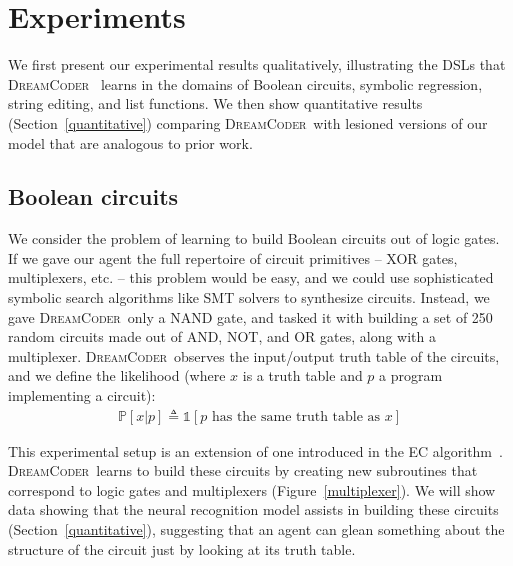 \documentclass{article}
\newcommand{\system}{\textsc{DreamCoder}~}
\newcommand{\indicator}{\mathds{1}} %
\newcommand{\probability}{\mathds{P}} %
\begin{document}
\section{Experiments}
We first present our experimental results qualitatively,
illustrating the DSLs that  \system
learns in the domains of Boolean circuits, symbolic regression, string editing, and list functions.
We then show quantitative results (Section~\ref{quantitative})
comparing \system with lesioned versions
of our model that are analogous to prior work.

\subsection{Boolean circuits}
We consider the problem of learning
to build  Boolean circuits out of logic gates.
If we gave our agent the full repertoire of
circuit primitives -- XOR gates, multiplexers, etc. -- this problem would be easy,
and we could use sophisticated symbolic search algorithms like SMT solvers to synthesize circuits.
Instead, we gave \system only a NAND gate,
and tasked it with building a set of 250 random circuits made out of
AND, NOT, and OR gates, along with a multiplexer.
\system observes the input/output truth table of the circuits,
and we define the likelihood (where $x$ is a truth table and $p$ a program implementing a circuit):
\begin{align}
  \probability[x|p]\triangleq\indicator\left[p\text{ has  the same truth table as }x \right]\nonumber
  \end{align}

This experimental setup is an extension of one introduced in the EC algorithm~\cite{Dechter:2013:BLV:2540128.2540316}.
\system learns to build these
circuits by creating new subroutines that correspond to
logic gates and multiplexers (Figure~\ref{multiplexer}).
We will show data showing that the neural recognition model
assists in building these circuits (Section~\ref{quantitative}),
suggesting that an agent can glean something about the structure of the circuit just by looking at its truth table.
\end{document}
